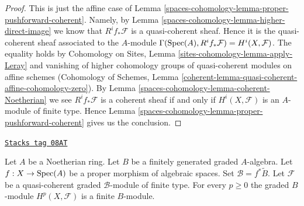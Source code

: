\begin{proof}
This is just the affine case of Lemma \ref{spaces-cohomology-lemma-proper-pushforward-coherent}.
Namely, by Lemma \ref{spaces-cohomology-lemma-higher-direct-image} we know that
$R^if_*\mathcal{F}$ is a quasi-coherent sheaf. Hence it is the quasi-coherent
sheaf associated to the $A$-module
$\Gamma(\operatorname{Spec}(A), R^if_*\mathcal{F}) = H^i(X, \mathcal{F})$.
The equality holds by
Cohomology on Sites, Lemma \ref{sites-cohomology-lemma-apply-Leray}
and vanishing of higher cohomology groups of quasi-coherent modules
on affine schemes (Cohomology of Schemes, Lemma
\ref{coherent-lemma-quasi-coherent-affine-cohomology-zero}).
By Lemma \ref{spaces-cohomology-lemma-coherent-Noetherian} we see $R^if_*\mathcal{F}$ is
a coherent sheaf if and only if $H^i(X, \mathcal{F})$
is an $A$-module of finite type. Hence
Lemma \ref{spaces-cohomology-lemma-proper-pushforward-coherent} gives us the conclusion.
\end{proof}

\begin{lemma}
\label{spaces-cohomology-lemma-graded-finiteness}
\href{https://stacks.math.columbia.edu/tag/08AT}{\texttt{Stacks tag 08AT}}

Let $A$ be a Noetherian ring.
Let $B$ be a finitely generated graded $A$-algebra.
Let $f : X \to \operatorname{Spec}(A)$ be a proper morphism of algebraic spaces.
Set $\mathcal{B} = f^*\widetilde B$.
Let $\mathcal{F}$ be a quasi-coherent
graded $\mathcal{B}$-module of finite type.
For every $p \geq 0$ the graded $B$-module $H^p(X, \mathcal{F})$
is a finite $B$-module.
\end{lemma}

